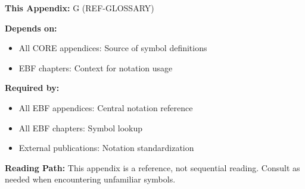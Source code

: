
\begin{tcolorbox}[colback=gray!10!white, colframe=gray!75!black,
    title=\textbf{Cross-Reference Footer}]

\textbf{This Appendix:} G (REF-GLOSSARY)

\textbf{Depends on:}
\begin{itemize}[nosep]
    \item All CORE appendices: Source of symbol definitions
    \item EBF chapters: Context for notation usage
\end{itemize}

\textbf{Required by:}
\begin{itemize}[nosep]
    \item All EBF appendices: Central notation reference
    \item All EBF chapters: Symbol lookup
    \item External publications: Notation standardization
\end{itemize}

\textbf{Reading Path:}
This appendix is a reference, not sequential reading.
Consult as needed when encountering unfamiliar symbols.

\end{tcolorbox}

